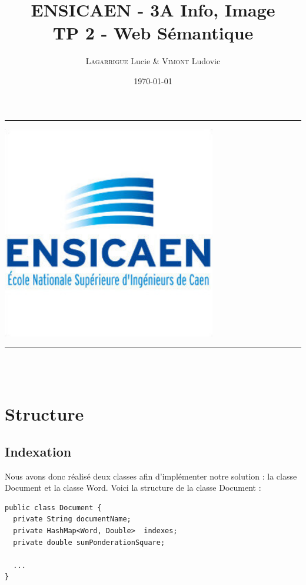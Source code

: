 \documentclass{article}
\title{ENSICAEN - 3A Info, Image\\TP 2 - Web Sémantique}
\author{\textsc{Lagarrigue} Lucie \& \textsc{Vimont} Ludovic}
\date{\today}
\newcommand{\HRule}{\rule{\linewidth}{0.5mm}}
\begin{document}
\begin{titlepage}
	\begin{center}
		\vspace*{\fill}
		\textsc{\Large \@title }
		\HRule
		\vspace{0.5cm}
		\begin{center}
			\includegraphics[width=0.7\textwidth]{../data/logo.jpg}
		\end{center}
		\vspace{0.5cm}
		\HRule \\
		\large{\@author} \\
		\@date
		\vspace*{\fill}
	\end{center}
\end{titlepage}


\section{Structure}
\subsection{Indexation}
Nous avons donc réalisé deux classes afin d'implémenter notre solution : la classe
Document et la classe Word. Voici la structure de la classe Document :

\begin{lstlisting}
public class Document {
  private String documentName;
  private HashMap<Word, Double>  indexes;
  private double sumPonderationSquare;

  ...
}
\end{lstlisting}
\end{document}
